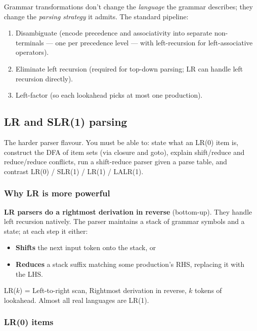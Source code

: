 \documentclass[11pt,a4paper]{article}
\begin{document}
Grammar transformations don't change the \emph{language} the grammar describes; they change the \emph{parsing strategy} it admits. The standard pipeline:

\begin{enumerate}[leftmargin=*,itemsep=1pt]
  \item Disambiguate (encode precedence and associativity into separate non-terminals --- one per precedence level --- with left-recursion for left-associative operators).
  \item Eliminate left recursion (required for top-down parsing; LR can handle left recursion directly).
  \item Left-factor (so each lookahead picks at most one production).
\end{enumerate}

\subsection{LR and SLR(1) parsing}

\begin{must}
The harder parser flavour. You must be able to: state what an LR(0) item is, construct the DFA of item sets (via closure and goto), explain shift/reduce and reduce/reduce conflicts, run a shift-reduce parser given a parse table, and contrast LR(0) / SLR(1) / LR(1) / LALR(1).
\end{must}

\subsubsection*{Why LR is more powerful}

\textbf{LR parsers do a rightmost derivation in reverse} (bottom-up). They handle left recursion natively. The parser maintains a stack of grammar symbols and a state; at each step it either:
\begin{itemize}[leftmargin=*,itemsep=0pt]
  \item \textbf{Shifts} the next input token onto the stack, or
  \item \textbf{Reduces} a stack suffix matching some production's RHS, replacing it with the LHS.
\end{itemize}

LR($k$) = Left-to-right scan, Rightmost derivation in reverse, $k$ tokens of lookahead. Almost all real languages are LR(1).

\subsubsection*{LR(0) items}
\end{document}

